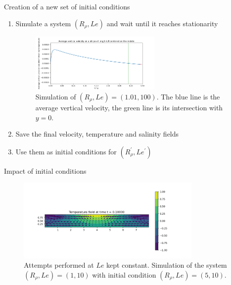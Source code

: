 \documentclass[10pt]{beamer}
\begin{document}
\begin{frame}{Creation of a new set of initial conditions}
  \begin{enumerate}
    \item Simulate a system $(R_{\rho},Le)$ and wait until it reaches stationarity
          \begin{figure}
            \centering
            \includegraphics[width=0.6\textwidth]{images/last_subsection/transition_temp_to_salin.png}
            \caption{Simulation of $(R_{\rho},Le) = (1.01,100)$. The blue line is the average vertical velocity,
              the green line is its intersection with $y = 0$.}
          \end{figure}
    \item Save the final velocity, temperature and salinity fields
    \item Use them as initial conditions for $(R_{\rho}^{\prime},Le^{\prime})$
  \end{enumerate}
\end{frame}

\begin{frame}{Impact of initial conditions}
  \begin{figure}
    \centering
    \includegraphics[width=0.8\textwidth]{images/last_subsection/combination_temperature_temp_R_rho_5_to_1_prs_0_1.png}
    \caption{Attempts performed at $Le$ kept constant. Simulation of the system $(R_{\rho},Le) = (1,10)$ with initial condition $(R_{\rho},Le) = (5,10)$.}
  \end{figure}
\end{frame}
\end{document}
